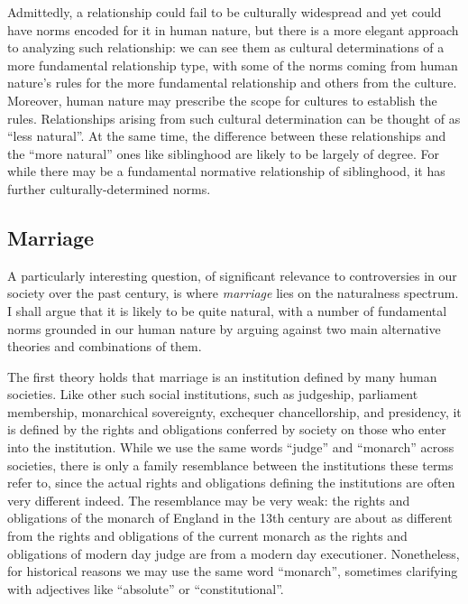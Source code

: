 Admittedly, a relationship could fail to be culturally widespread and yet could have norms encoded for it in human nature, but there is a more elegant approach to
analyzing such relationship: we can see them as cultural determinations of a more fundamental relationship type, with some of the norms coming from human nature's
rules for the more fundamental relationship and others from the culture. Moreover, human nature may prescribe the scope for cultures to establish the rules.
Relationships arising from such cultural determination can be thought of as ``less natural''. At the same time, the difference between these relationships and the ``more natural'' ones like siblinghood
are likely to be largely of degree. For while there may be a fundamental normative relationship of siblinghood, it has further culturally-determined
norms.

\subsection{Marriage}
A particularly interesting question, of significant relevance to controversies in our society over the past century, is where \textit{marriage}
lies on the naturalness spectrum. I shall argue that it is likely to be quite natural, with a number of fundamental norms grounded in our human
nature by arguing against two main alternative theories and combinations of them.

The first theory holds that marriage is an institution defined by many human societies. Like other such social institutions, such as judgeship, parliament membership,
monarchical sovereignty, exchequer chancellorship, and presidency, it is defined by the rights and obligations conferred by society on those who enter into the institution.
While we use the same words ``judge'' and ``monarch'' across societies, there is only a family resemblance between the institutions these terms refer to, since the actual
rights and obligations defining the institutions are often very different indeed. The resemblance may be very weak: the rights and obligations of the monarch of England
in the 13th century are about as different from the rights and obligations of the current monarch as the rights and obligations of modern day judge are from a modern day
executioner. Nonetheless, for historical reasons we may use the same word ``monarch'', sometimes clarifying with adjectives like ``absolute'' or ``constitutional''.

